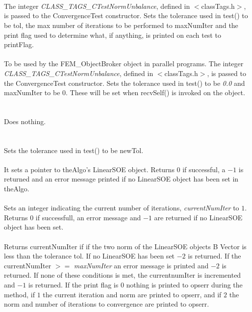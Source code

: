   \\
  \\ 
  \\
The integer {\em CLASS\_TAGS\_CTestNormUnbalance}, defined in
$<$classTags.h$>$, is passed to the ConvergenceTest constructor. 
Sets the tolerance used in test() to be \p tol, the max
number of iterations to be performed to \p maxNumIter and the print
flag used to determine what, if anything, is printed on each test to
\p printFlag. \\

  \\
To be used by the FEM\_ObjectBroker object in parallel programs. The
integer {\em CLASS\_TAGS\_CTestNormUnbalance}, defined in
$<$classTags.h$>$, is passed to the ConvergenceTest constructor. Sets
the tolerance used in test() to be {\em 0.0} and \p maxNumIter 
to be $0$. These will be set when recvSelf() is invoked on the object. \\

 \\
 \\ 
Does nothing. \\

  \\
 \\
Sets the tolerance used in test() to be \p newTol. \\

 \\
It sets a pointer to \p theAlgo's LinearSOE object. Returns $0$ if
successful, a $-1$ is returned and an error message printed if no
LinearSOE object has been set in \p theAlgo. \\

 \\
Sets an integer indicating the current number of iterations, {\em
currentNumIter} to $1$. Returns $0$ if successfull, an error message
and $-1$ are returned if no LinearSOE object has been set. \\ 

 \\
Returns {currentNumIter} if if the two norm of the LinearSOE objects B
Vector is less than the tolerance \p tol. If no LinearSOE has been
set $-2$ is returned. If the \p currentNumIter $>=$ {\em
maxNumIter} an error message is printed and $-2$ is returned. If none
of these conditions is met, the \p currentnumIter is incremented 
and $-1$ is returned. If the print flag is $0$ nothing is printed to
opserr during the method, if $1$ the current iteration and norm are
printed to opserr, and if $2$ the norm and number of iterations to convergence
are printed to opserr. \\ 


